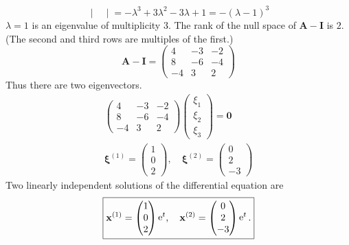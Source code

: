 {\begin{Solution}
\begin{enumerate}
\begin{enumerate}
\[\begin{vmatrix}
      \end{vmatrix}
      = - \lambda^3 + 3 \lambda^2 - 3 \lambda + 1
      = - (\lambda - 1)^3
      \]
      $\lambda = 1$ is an eigenvalue of multiplicity $3$.
      The rank of the null space of $\mathbf{A} - \mathbf{I}$ is $2$. 
      (The second and third rows are multiples of the first.)
      \[
      \mathbf{A} - \mathbf{I} 
      = \begin{pmatrix}
        4 & -3 & -2 \\
        8 & -6 & -4 \\
        -4 & 3 & 2
      \end{pmatrix}
      \]
      Thus there are two eigenvectors. 
      \begin{gather*}
        \begin{pmatrix}
          4 & -3 & -2 \\
          8 & -6 & -4 \\
          -4 & 3 & 2
        \end{pmatrix}
        \begin{pmatrix}
          \xi_1 \\
          \xi_2 \\
          \xi_3
        \end{pmatrix}
        = \mathbf{0} \\
        \boldsymbol{\xi}^{(1)} = \begin{pmatrix}
          1 \\
          0 \\
          2
        \end{pmatrix}, \quad
        \boldsymbol{\xi}^{(2)} = \begin{pmatrix}
          0 \\
          2 \\
          -3
        \end{pmatrix}
      \end{gather*}
      Two linearly independent solutions of the differential equation are
      \[
      \boxed{
        \mathbf{x}^{(1)} = \begin{pmatrix}
          1 \\
          0 \\
          2
        \end{pmatrix} \mathop{\mathrm{e}}\nolimits^t, \quad
        \mathbf{x}^{(2)} = \begin{pmatrix}
          0 \\
          2 \\
          -3
        \end{pmatrix} \mathop{\mathrm{e}}\nolimits^t.
}\]
\end{enumerate}
\end{enumerate}
\end{Solution}}
